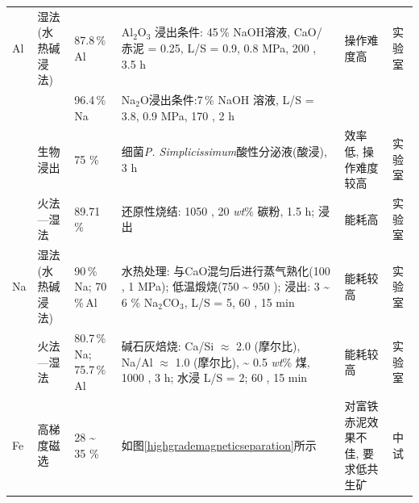 \vspace{20pt}
\begin{center}
	\setlength{\belowcaptionskip}{15pt plus 0.6ex minus 0.03ex}
	\tablelasttail{\bottomrule[1.5pt]}
\begin{spacing}{1}\wu%
		\begin{supertabular}[!h]{p{0.3cm}p{1.6cm}p{1.5cm}p{4.1cm}p{2.4cm}p{1.2cm}}
			Al&湿法(水热碱浸法)&87.8\,\% Al&Al$_{\mathrm{2}}$O$_{\mathrm{3}}$ 浸出条件: 45\,\% NaOH溶液, CaO/赤泥 = 0.25, L/S = 0.9, 0.8 MPa, 200 \textcelsius, 3.5 h&操作难度高&实验室\\ 
			&&96.4\,\%\,Na&Na$_{\mathrm{2}}$O浸出条件:7\,\% NaOH 溶液, L/S = 3.8, 0.9 MPa, 170 \textcelsius, 2 h&&\\
			&生物浸出&75 \%&细菌\textit{P. Simplicissimum}酸性分泌液(酸浸), 3 h&效率低, 操作难度较高&实验室\\ 
			&火法—湿法&89.71 \%&还原性烧结: 1050 \textcelsius, 20 \textit{wt}\% 碳粉, 1.5 h; 浸出&能耗高&实验室\\
			Na&湿法(水热碱浸法)&90\,\%\,Na; 70\,\%\,Al&水热处理: 与CaO混匀后进行蒸气熟化(100 \textcelsius, 1 MPa); 低温煅烧(750 \textasciitilde{ }950 \textcelsius); 浸出: 3 \textasciitilde{ }6 \% Na$_{\mathrm{2}}$CO$_{\mathrm{3}}$, L/S = 5, 60 \textcelsius, 15 min&能耗较高&实验室\\
			&火法—湿法&80.7\,\%\,Na; 75.7\,\%\,Al&碱石灰焙烧: Ca/Si $\approx$ 2.0 (摩尔比), Na/Al $\approx$ 1.0 (摩尔比), \textasciitilde{ }0.5 \textit{wt}\% 煤, 1000 \textcelsius, 3 h; 水浸 L/S = 2; 60 \textcelsius, 15 min&能耗较高&实验室\\
			Fe&高梯度磁选&28 \textasciitilde{ }35 \%&如图\ref{highgrademagneticseparation}所示&对富铁赤泥效果不佳, 要求低共生矿&中试\\

\end{supertabular}
\end{spacing}
\end{center}
